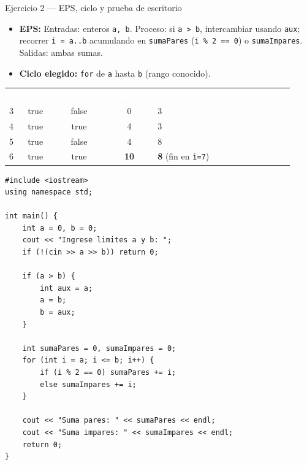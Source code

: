 \documentclass[11pt,letterpaper]{article}
\begin{document}
\begin{solucion}{Ejercicio 2 --- EPS, ciclo y prueba de escritorio}
\begin{itemize}
  \item \textbf{EPS:} Entradas: enteros \texttt{a, b}. Proceso: si \texttt{a > b}, intercambiar usando \texttt{aux}; recorrer \texttt{i = a..b} acumulando en \texttt{sumaPares} (\texttt{i \% 2 == 0}) o \texttt{sumaImpares}. Salidas: ambas sumas.
  \item \textbf{Ciclo elegido:} \texttt{for} de \texttt{a} hasta \texttt{b} (rango conocido).
\end{itemize}
\begin{center}
\footnotesize
\renewcommand{\arraystretch}{1.15}
\begin{tabularx}{0.9\linewidth}{c c c c X}
\rowcolor{AzulMarino}
\textcolor{white}{\texttt{i}} & \textcolor{white}{\texttt{i <= 6}} & \textcolor{white}{\texttt{i \% 2 == 0}} & \textcolor{white}{\texttt{sumaPares}} & \textcolor{white}{\texttt{sumaImpares} (\texttt{a=6, b=3 -> 3..6})} \\
3 & true & false & 0 & 3 \\
4 & true & true & 4 & 3 \\
5 & true & false & 4 & 8 \\
6 & true & true & \textbf{10} & \textbf{8} (fin en \texttt{i=7}) \\
\bottomrule
\end{tabularx}
\end{center}
\end{solucion}

\begin{lstlisting}[style=cppmonitoria,caption={Solución Ejercicio 2: Suma de pares e impares (C++)}]
#include <iostream>
using namespace std;

int main() {
    int a = 0, b = 0;
    cout << "Ingrese limites a y b: ";
    if (!(cin >> a >> b)) return 0;

    if (a > b) {
        int aux = a;
        a = b;
        b = aux;
    }

    int sumaPares = 0, sumaImpares = 0;
    for (int i = a; i <= b; i++) {
        if (i % 2 == 0) sumaPares += i;
        else sumaImpares += i;
    }

    cout << "Suma pares: " << sumaPares << endl;
    cout << "Suma impares: " << sumaImpares << endl;
    return 0;
}
\end{lstlisting}

\end{document}
